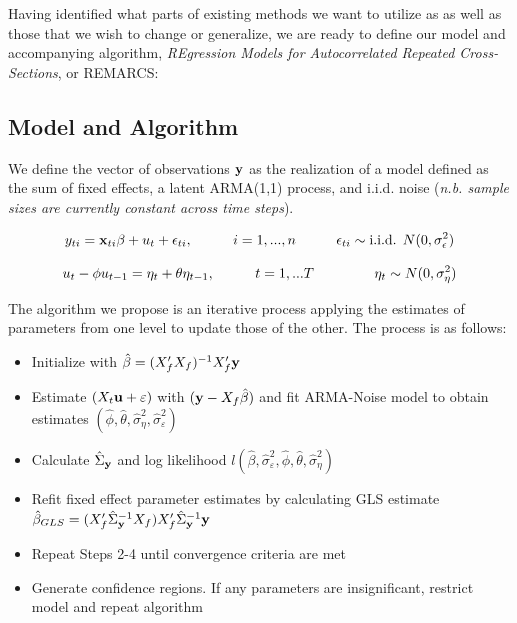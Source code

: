 Having identified what parts of existing methods we want to utilize as as well as those that we wish to change or generalize, we are ready to define our model and accompanying algorithm, \textit{REgression Models for Autocorrelated Repeated Cross-Sections}, or REMARCS:
\subsection{Model and Algorithm}


We define the vector of observations $\mathbf{y}$ as the realization of a model defined as the sum of fixed effects, a latent ARMA(1,1) process, and i.i.d. noise (\textit{n.b. sample sizes are currently constant across time steps}).

\begin{equation}
    \label{eq:fullmodel1}
    y_{ti} = \mathbf{x}_{ti}\beta + u_t + \epsilon_{ti}, \hspace{.4in} i = 1,...,n \hspace{.4 in} \epsilon_{ti} \sim \text{i.i.d. } N(0,\sigma_\epsilon^2) 
\end{equation}

\begin{equation}
    \label{eq:fullmodel2}
    u_t - \phi u_{t-1} = \eta_t + \theta \eta_{t-1} , \hspace{.4in} t=1,...T \hspace{.4in}  \hspace{.2in} \eta_t \sim N(0,\sigma_\eta^2) 
\end{equation}

The algorithm we propose is an iterative process applying the estimates of parameters from one level to update those of the other. The process is as follows:

\begin{itemize}
    \item[1)] Initialize with $\hat{\beta} = (X_f'X_f)^{-1}X_f'\mathbf{y}$
    \item[2)] Estimate $(X_t\mathbf{u} + \varepsilon)$ with $(\mathbf{y} - X_f\hat{\beta})$ and fit ARMA-Noise model to obtain estimates $(\hat{\phi}, \hat{\theta}, \hat{\sigma}_\eta^2, \hat{\sigma}_\varepsilon^2)$
    \item[3)] Calculate $\hat{\Sigma}_{\mathbf{y}}$ and log likelihood $l(\hat{\beta}, \hat{\sigma}_\varepsilon^2, \hat{\phi}, \hat{\theta}, \hat{\sigma}_\eta^2)$
    \item[4)] Refit fixed effect parameter estimates by calculating GLS estimate $\hat{\beta}_{GLS} = (X_f'\hat{\Sigma}_{\mathbf{y}}^{-1}X_f)X_f'\hat{\Sigma}_{\mathbf{y}}^{-1}\mathbf{y}$
    \item[5)] Repeat Steps 2-4 until convergence criteria are met
    \item[6)] Generate confidence regions. If any parameters are insignificant, restrict model and repeat algorithm
\end{itemize}


